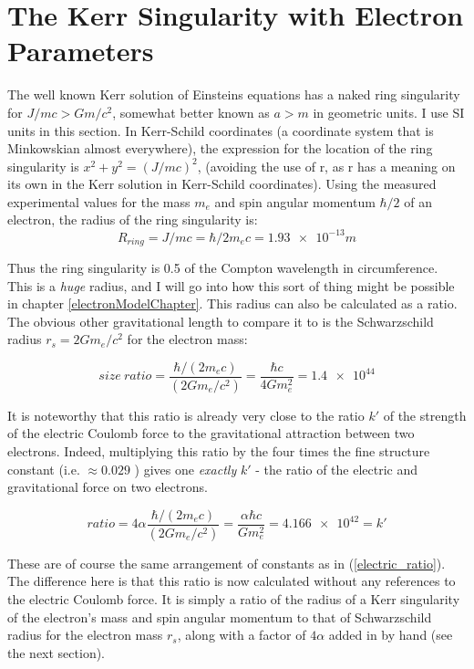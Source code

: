 \documentclass[../rzero]{subfiles}
\begin{document}
\section{The Kerr Singularity with Electron Parameters}
The well known Kerr solution of Einsteins equations has a naked ring singularity for $J/mc > Gm/c^2$, somewhat better known as $a > m$ in geometric units. I use SI units in this section. In Kerr-Schild coordinates (a coordinate system that is Minkowskian almost everywhere)\cite{Visser2008}, the expression for the location of the ring singularity is $x^2 + y^2 = (J/mc)^2$, (avoiding the use of r, as r has a meaning on its own in the Kerr solution in Kerr-Schild coordinates). Using the measured experimental values for the mass $m_e$ and spin angular momentum $\hbar/2$ of an electron, the radius of the ring singularity is:
\begin{equation} \label{radius_eqn}
	R_{ring} = J/mc = \hbar/2m_ec = \num{1.93e-13}m
\end{equation}

Thus the ring singularity is 0.5 of the Compton wavelength in circumference. This is a \textit{huge} radius, and I will go into how this sort of thing might be possible in chapter \ref{electronModelChapter}. This radius can also be calculated as a ratio. The obvious other gravitational length to compare it to is the Schwarzschild radius $r_s = 2Gm_e/c^2$ for the electron mass:

\begin{equation}
	size \ ratio = \frac{\hbar/(2m_ec)}{(2Gm_e/c^2)} = \frac{\hbar c}{4G m_e^2} = \num{1.4e44}
\end{equation}

 It is noteworthy that this ratio is already very close to the ratio $k'$ of the strength of the electric Coulomb force to the gravitational attraction between two electrons. Indeed, multiplying this ratio by the four times the fine structure constant (i.e. $\approx 0.029 $ ) gives one \textit{exactly} $k'$ - the ratio of the electric and gravitational force on two electrons.
 
\begin{equation}
	ratio = 4\alpha \frac{\hbar/(2m_ec)}{(2Gm_e/c^2)} = \frac{\alpha \hbar c}{G m_e^2} = \num{4.166e42} = k'
\end{equation}


These are of course the same arrangement of constants as in (\ref{electric_ratio}). The difference here is that this ratio is now calculated without any references to the electric Coulomb force. It is simply a ratio of the radius of a Kerr singularity of the electron's mass and spin angular momentum to that of Schwarzschild radius for the electron mass $r_s$, along with a factor of $4\alpha$ added in by hand (see the next section). 
\end{document}
